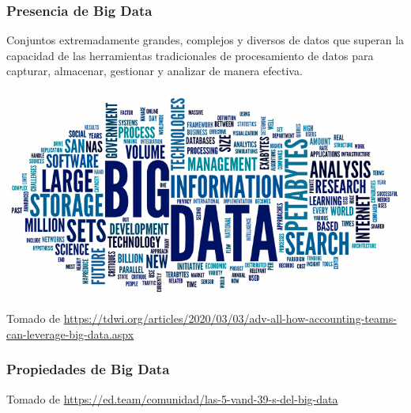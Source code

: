 \documentclass[
10pt, %
aspectratio=169, %
]{beamer}
\begin{document}
	\begin{frame}
		
		\frametitle{Presencia de Big Data}
		
		\begin{alertblock}{}
			Conjuntos extremadamente grandes, complejos y diversos de datos que superan la capacidad de las herramientas tradicionales de procesamiento de datos para capturar, almacenar, gestionar y analizar de manera efectiva.
		\end{alertblock}
		
		
		
		\centering
		\includegraphics[scale=0.4]{big-data.png}
		
		{\scriptsize Tomado de 	\url{https://tdwi.org/articles/2020/03/03/adv-all-how-accounting-teams-can-leverage-big-data.aspx}}
		
		
	\end{frame}
	
	\begin{frame}
		
		\frametitle{Propiedades de Big Data}
		
		
		\centering
		\vspace{12\baselineskip}
		{\scriptsize Tomado de 	\url{https://ed.team/comunidad/las-5-vand-39-s-del-big-data}}
		
	\end{frame}
	
\end{document}

